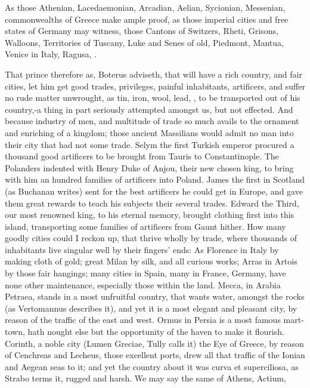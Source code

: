 {As those Athenian, Lacedaemonian, Arcadian, Aelian, Sycionian,
Messenian, \etc{} commonwealths of Greece make ample proof, as those
imperial cities and free states of Germany may witness, those Cantons
of Switzers, Rheti, Grisons, Walloons, Territories of Tuscany, Luke and
Senes of old, Piedmont, Mantua, Venice in Italy, Ragusa, \etc{}.

That prince therefore as, Boterus adviseth, that will have a rich
country, and fair cities, let him get good trades, privileges, painful
inhabitants, artificers, and suffer no rude matter unwrought, as tin,
iron, wool, lead, \etc{}, to be transported out of his country,-a
thing in part seriously attempted amongst us, but not effected. And
because industry of men, and multitude of trade so much avails to the
ornament and enriching of a kingdom; those ancient Massilians
would admit no man into their city that had not some trade. Selym the
first Turkish emperor procured a thousand good artificers to be brought
from Tauris to Constantinople. The Polanders indented with Henry Duke
of Anjou, their new chosen king, to bring with him an hundred families
of artificers into Poland. James the first in Scotland (as
Buchanan writes) sent for the best artificers he could get in
Europe, and gave them great rewards to teach his subjects their several
trades. Edward the Third, our most renowned king, to his eternal
memory, brought clothing first into this island, transporting some
families of artificers from Gaunt hither. How many goodly cities could
I reckon up, that thrive wholly by trade, where thousands of
inhabitants live singular well by their fingers' ends: As Florence in
Italy by making cloth of gold; great Milan by silk, and all curious
works; Arras in Artois by those fair hangings; many cities in Spain,
many in France, Germany, have none other maintenance, especially those
within the land. Mecca, in Arabia Petraea, stands in a most
unfruitful country, that wants water, amongst the rocks (as Vertomannus
describes it), and yet it is a most elegant and pleasant city, by
reason of the traffic of the east and west. Ormus in Persia is a most
famous mart-town, hath nought else but the opportunity of the haven to
make it flourish. Corinth, a noble city (Lumen Greciae, Tully calls it)
the Eye of Greece, by reason of Cenchreas and Lecheus, those excellent
ports, drew all that traffic of the Ionian and Aegean seas to it; and
yet the country about it was curva et superciliosa, as Strabo
terms it, rugged and harsh. We may say the same of Athens, Actium,
}
